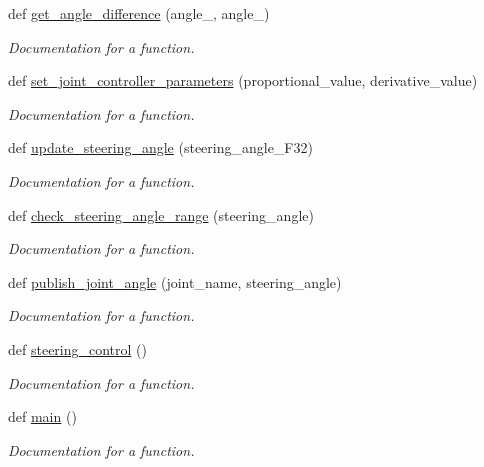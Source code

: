\begin{DoxyCompactItemize}
def \mbox{\hyperlink{namespacesteering__simulation_a920f69692c79162b2296b1a220bba527}{get\+\_\+angle\+\_\+difference}} (angle\+\_, angle\+\_)
\begin{DoxyCompactList}\small\item\em Documentation for a function. \end{DoxyCompactList}\item 
def \mbox{\hyperlink{namespacesteering__simulation_a787fcfa65451a11a9f94afaea6a6e809}{set\+\_\+joint\+\_\+controller\+\_\+parameters}} (proportional\+\_\+value, derivative\+\_\+value)
\begin{DoxyCompactList}\small\item\em Documentation for a function. \end{DoxyCompactList}\item 
def \mbox{\hyperlink{namespacesteering__simulation_ade71f08294031e29a94a9be5cc1f0961}{update\+\_\+steering\+\_\+angle}} (steering\+\_\+angle\+\_\+\+F32)
\begin{DoxyCompactList}\small\item\em Documentation for a function. \end{DoxyCompactList}\item 
def \mbox{\hyperlink{namespacesteering__simulation_abe8ecf85be641d2a56c547e4e27946ba}{check\+\_\+steering\+\_\+angle\+\_\+range}} (steering\+\_\+angle)
\begin{DoxyCompactList}\small\item\em Documentation for a function. \end{DoxyCompactList}\item 
def \mbox{\hyperlink{namespacesteering__simulation_aa303bfd6d5e874d19fda9e678aa4c3d9}{publish\+\_\+joint\+\_\+angle}} (joint\+\_\+name, steering\+\_\+angle)
\begin{DoxyCompactList}\small\item\em Documentation for a function. \end{DoxyCompactList}\item 
def \mbox{\hyperlink{namespacesteering__simulation_a7e6cf517d5eedfae29bc0b05bada6a3e}{steering\+\_\+control}} ()
\begin{DoxyCompactList}\small\item\em Documentation for a function. \end{DoxyCompactList}\item 
def \mbox{\hyperlink{namespacesteering__simulation_af3dec39cd8650ad512084dfda32c577a}{main}} ()
\begin{DoxyCompactList}\small\item\em Documentation for a function. \end{DoxyCompactList}\end{DoxyCompactItemize}
